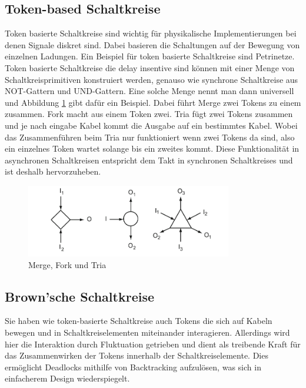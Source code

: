 \documentclass[11pt,a4paper]{article}
\begin{document}
\subsection{Token-based Schaltkreise}
Token basierte Schaltkreise sind wichtig für physikalische Implementierungen
bei denen Signale diskret sind.
%
Dabei basieren die Schaltungen auf der Bewegung
von einzelnen Ladungen. 
%
Ein Beispiel für token basierte Schaltkreise sind Petrinetze. 
%
Token basierte Schaltkreise die delay insentive sind können mit 
einer Menge von Schaltkreisprimitiven konstruiert werden, genauso 
wie synchrone Schaltkreise aus NOT-Gattern und UND-Gattern.
%
Eine solche Menge nennt man dann universell und Abbildung \ref{fig:tokenBased} gibt 
dafür ein Beispiel.
%
Dabei führt Merge zwei Tokens zu einem zusammen.
% 
Fork macht aus einem Token zwei.
%
Tria fügt zwei Tokens zusammen und je nach eingabe Kabel kommt
die Ausgabe auf ein bestimmtes Kabel.
%
Wobei das Zusammenführen beim Tria nur funktioniert wenn zwei Tokens da sind,
also ein einzelnes Token wartet solange bis ein zweites kommt.
%
Diese Funktionalität in asynchronen Schaltkreisen entspricht dem Takt in
synchronen Schaltkreises und ist deshalb hervorzuheben.
%

\begin{figure}[h]
       \centering
       \includegraphics[width=9cm]{bilder/tokenBased.png}
       \caption{Merge, Fork und Tria}
       \label{fig:tokenBased}
\end{figure}    

%

\subsection{Brown'sche Schaltkreise}
Sie haben wie token-basierte Schaltkreise auch Tokens die sich auf Kabeln 
bewegen und in Schaltkreiselementen miteinander interagieren.
%
Allerdings wird hier die Interaktion durch Fluktuation getrieben und dient
als treibende Kraft für das Zusammenwirken der Tokens innerhalb der
Schaltkreiselemente. 
%
Dies ermöglicht Deadlocks mithilfe 
von Backtracking aufzulösen, was sich in einfacherem Design wiederspiegelt.
\end{document}
